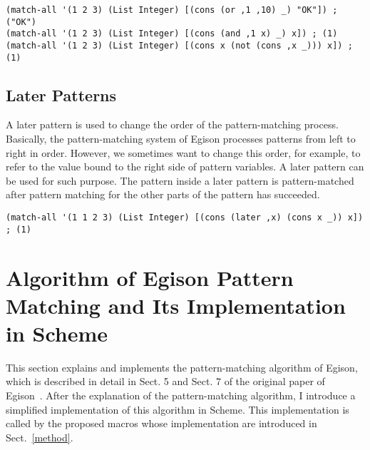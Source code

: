 \documentclass[acmlarge]{acmart}
\begin{document}
\begin{lstlisting}[language=egison]
(match-all '(1 2 3) (List Integer) [(cons (or ,1 ,10) _) "OK"]) ; ("OK")
(match-all '(1 2 3) (List Integer) [(cons (and ,1 x) _) x]) ; (1)
(match-all '(1 2 3) (List Integer) [(cons x (not (cons ,x _))) x]) ; (1)
\end{lstlisting}

\subsection{Later Patterns}

A later pattern is used to change the order of the pattern-matching process.
Basically, the pattern-matching system of Egison processes patterns from left to right in order.
However, we sometimes want to change this order, for example, to refer to the value bound to the right side of pattern variables.
A later pattern can be used for such purpose.
The pattern inside a later pattern is pattern-matched after pattern matching for the other parts of the pattern has succeeded.

\begin{lstlisting}[language=egison]
(match-all '(1 1 2 3) (List Integer) [(cons (later ,x) (cons x _)) x]) ; (1)
\end{lstlisting}



\section{Algorithm of Egison Pattern Matching and Its Implementation in Scheme}\label{algorithm}

This section explains and implements the pattern-matching algorithm of Egison, which is described in detail in Sect. 5 and Sect. 7 of the original paper of Egison~\cite{egi2018aplas}.
After the explanation of the pattern-matching algorithm, I introduce a simplified implementation of this algorithm in Scheme.
This implementation is called by the proposed macros whose implementation are introduced in Sect.~\ref{method}.

\medskip
\end{document}
